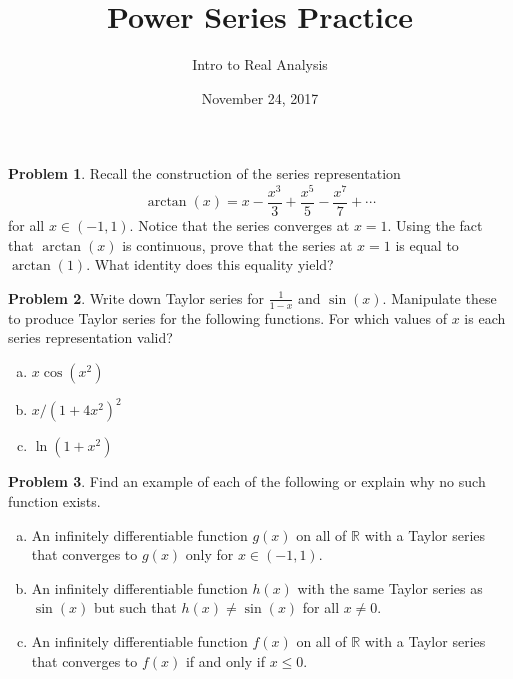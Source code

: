 \documentclass{amsart}
\newcommand{\+}[1]{\ensuremath{\mathbf{#1}}}
\newcommand{\R}{{\mathbb R}}
\theoremstyle{definition}
\newtheorem{prob}{Problem}
\begin{document}
\title{Power Series Practice}
\date{November 24, 2017}
\author{Intro to Real Analysis}

\maketitle

\begin{prob}
Recall the construction of the series representation
\[\arctan(x) = x - \frac{x^3}{3} + \frac{x^5}{5} - \frac{x^7}{7} + \cdots\]
for all $x \in (-1,1)$.
Notice that the series converges at $x = 1$.
Using the fact that $\arctan(x)$ is continuous,
prove that the series at $x=1$ is equal to $\arctan(1)$.
What identity does this equality yield?
\end{prob}

\begin{prob}
 Write down Taylor series for $\frac{1}{1-x}$
 and $\sin(x)$.  Manipulate these to produce
 Taylor series for the following functions.  For which
 values of $x$ is each series representation valid?
\begin{enumerate}[(a)]
 \item $x\cos(x^2)$
 \item $x/(1+4x^2)^2$
 \item $\ln (1+x^2)$
\end{enumerate}
\end{prob}

\begin{prob}
 Find an example of each of the following or explain why
 no such function exists.
 \begin{enumerate}[(a)]
  \item An infinitely differentiable function
  $g(x)$ on all of $\R$ with a Taylor series that
  converges to $g(x)$ only for $x \in (-1,1)$.
  \item An infinitely differentiable function
  $h(x)$ with the same Taylor series as $\sin(x)$
  but such that $h(x) \neq \sin(x)$ for all $x \neq 0$.
  \item An infinitely differentiable function $f(x)$
  on all of $\R$ with a Taylor series that converges
  to $f(x)$ if and only if $x \leq 0$.
 \end{enumerate}
\end{prob}
\end{document}
